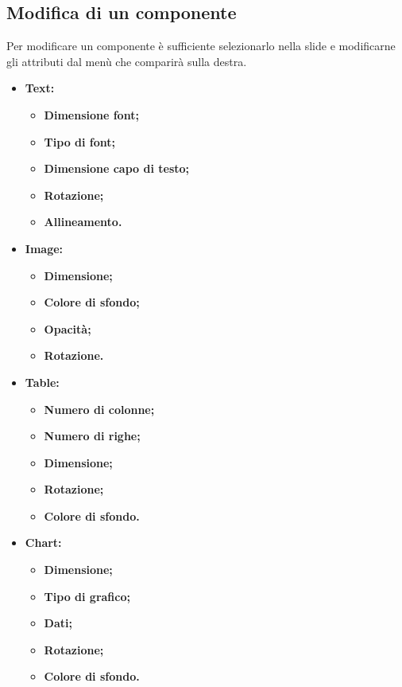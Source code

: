 \subsection{Modifica di un componente}
Per modificare un componente è sufficiente selezionarlo nella slide e modificarne gli attributi dal menù che comparirà sulla destra.
\begin{itemize}

	\item \textbf{Text:}
		\begin{itemize}
			\item \textbf{Dimensione font;}
			\item \textbf{Tipo di font;}
			\item \textbf{Dimensione capo di testo;}
			\item \textbf{Rotazione;}
			\item \textbf{Allineamento.}
		\end{itemize}
	
	\item \textbf{Image:}
		\begin{itemize}
			\item \textbf{Dimensione;}
			\item \textbf{Colore di sfondo;}
			\item \textbf{Opacità;}
			\item \textbf{Rotazione.}
		\end{itemize}

	\item \textbf{Table:}
		\begin{itemize}
			\item \textbf{Numero di colonne;}
			\item \textbf{Numero di righe;}
			\item \textbf{Dimensione;}
			\item \textbf{Rotazione;}
			\item \textbf{Colore di sfondo.}
		\end{itemize}
		
	\item \textbf{Chart:}
		\begin{itemize}
			\item \textbf{Dimensione;}
			\item \textbf{Tipo di grafico;}
			\item \textbf{Dati;}
			\item \textbf{Rotazione;}
			\item \textbf{Colore di sfondo.}
		\end{itemize}
	

\end{itemize}
